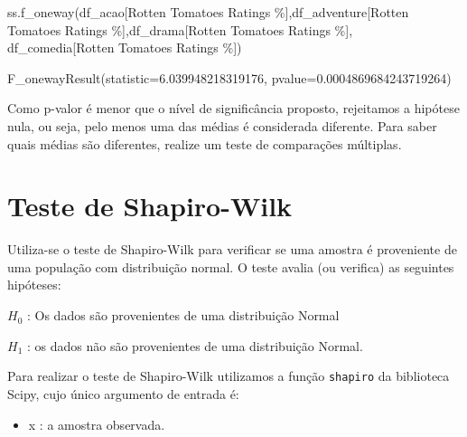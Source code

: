 \documentclass[
  letterpaper,
  DIV=11,
  numbers=noendperiod]{scrreprt}
\newenvironment{Shaded}{\begin{snugshade}}{\end{snugshade}}
\newcommand{\NormalTok}[1]{\textcolor[rgb]{0.00,0.23,0.31}{#1}}
\newcommand{\StringTok}[1]{\textcolor[rgb]{0.13,0.47,0.30}{#1}}
\providecommand{\tightlist}{%
  \setlength{\itemsep}{0pt}\setlength{\parskip}{0pt}}\usepackage{longtable,booktabs,array}
\begin{document}
\begin{Shaded}
\begin{Highlighting}[]
\NormalTok{ss.f\_oneway(df\_acao[}\StringTok{\textquotesingle{}Rotten Tomatoes Ratings \%\textquotesingle{}}\NormalTok{],df\_adventure[}\StringTok{\textquotesingle{}Rotten Tomatoes Ratings \%\textquotesingle{}}\NormalTok{],df\_drama[}\StringTok{\textquotesingle{}Rotten Tomatoes Ratings \%\textquotesingle{}}\NormalTok{], df\_comedia[}\StringTok{\textquotesingle{}Rotten Tomatoes Ratings \%\textquotesingle{}}\NormalTok{])}
\end{Highlighting}
\end{Shaded}

\begin{tcolorbox}[enhanced jigsaw, breakable, leftrule=.75mm, left=2mm, opacityback=0, bottomrule=.15mm, toprule=.15mm, rightrule=.15mm, arc=.35mm, colback=white]

F\_onewayResult(statistic=6.039948218319176,
pvalue=0.0004869684243719264)

\end{tcolorbox}

Como p-valor é menor que o nível de significância proposto, rejeitamos a
hipótese nula, ou seja, pelo menos uma das médias é considerada
diferente. Para saber quais médias são diferentes, realize um teste de
comparações múltiplas.


\hypertarget{teste-de-shapiro-wilk}{%
\chapter{Teste de Shapiro-Wilk}\label{teste-de-shapiro-wilk}}

Utiliza-se o teste de Shapiro-Wilk para verificar se uma amostra é
proveniente de uma população com distribuição normal. O teste avalia (ou
verifica) as seguintes hipóteses:

\(H_{0}\) : Os dados são provenientes de uma distribuição Normal

\(H_{1}\) : os dados não são provenientes de uma distribuição Normal.

Para realizar o teste de Shapiro-Wilk utilizamos a função
\texttt{shapiro} da biblioteca Scipy, cujo único argumento de entrada é:

\begin{itemize}
\tightlist
\item
  x : a amostra observada.
\end{itemize}
\end{document}
